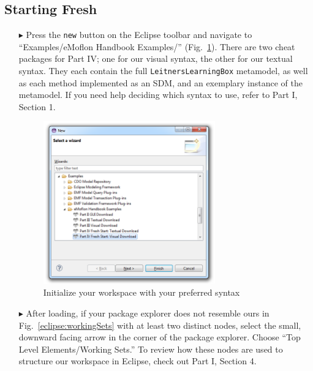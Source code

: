\subsection{Starting Fresh}
\label{sec:loadSourceMeta}
\begin{itemize}

\item[$\blacktriangleright$] Press the \texttt{new} button on the Eclipse toolbar and navigate to ``Examples/eMoflon Handbook Examples/''
(Fig.~\ref{eclipse:downPartIV}). There are two cheat packages for Part IV; one for our visual syntax, the other for our textual syntax. They each contain the
full \texttt{LeitnersLearningBox} metamodel, as well as each method implemented as an SDM, and an exemplary instance of the metamodel. If you need help
deciding which syntax to use, refer to Part I, Section 1.

\begin{figure}[htbp]
\begin{center}
  \includegraphics[width=0.7\textwidth]{eclipse_part4FreshWizardDownload}
  \caption{Initialize your workspace with your preferred syntax}
  \label{eclipse:downPartIV}
\end{center}
\end{figure}

\vspace{0.5cm}

\item[$\blacktriangleright$] After loading, if your package explorer does not resemble ours in Fig.~\ref{eclipse:workingSets} with at least two distinct nodes,
select the small, downward facing arrow in the corner of the package explorer. Choose ``Top Level Elements/Working Sets.'' To review how these nodes are used
to structure our workspace in Eclipse, check out Part I, Section 4.


\end{itemize}
